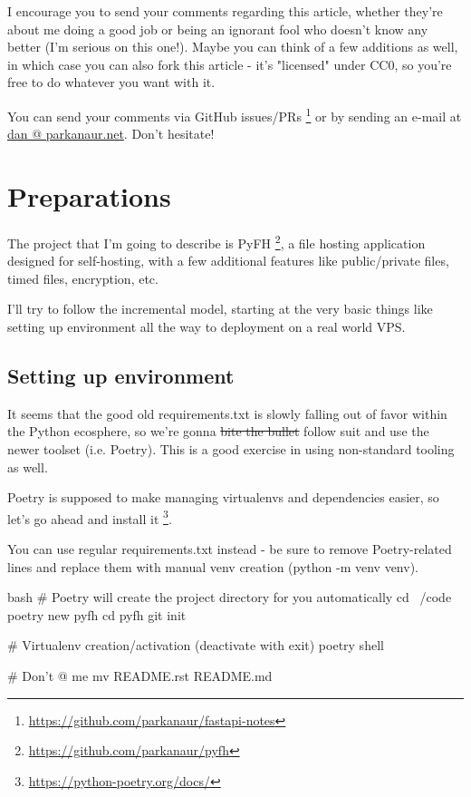 \documentclass[14pt]{extarticle}
\newcommand{\flink}[1]{\footnote{\href{#1}{#1}}}
\begin{document}
I encourage you to send your comments regarding this article, whether they're about me doing a good job or being an ignorant fool who doesn't know any better (I'm serious on this one!). Maybe you can think of a few additions as well, in which case you can also fork this article - it's "licensed" under CC0, so you're free to do whatever you want with it.

You can send your comments via GitHub issues/PRs \flink{https://github.com/parkanaur/fastapi-notes} or by sending an e-mail at {\href{mailto:dan@parkanaur.net}{dan @ parkanaur.net}}. Don't hesitate!

\section{Preparations}

The project that I'm going to describe is PyFH \flink{https://github.com/parkanaur/pyfh}, a file hosting application designed for self-hosting, with a few additional features like public/private files, timed files, encryption, etc.

I'll try to follow the incremental model, starting at the very basic things like setting up environment all the way to deployment on a real world VPS.

\subsection{Setting up environment}

It seems that the good old requirements.txt is slowly falling out of favor within the Python ecosphere, so we're gonna \sout{bite the bullet} follow suit and use the newer toolset (i.e. Poetry). This is a good exercise in using non-standard tooling as well.

Poetry is supposed to make managing virtualenvs and dependencies easier, so let's go ahead and install it \flink{https://python-poetry.org/docs/}.

You can use regular requirements.txt instead - be sure to remove Poetry-related lines and replace them with manual venv creation (python -m venv venv).

\begin{code}{bash}
    # Poetry will create the project directory for you automatically
    cd ~/code
    poetry new pyfh
    cd pyfh
    git init

    # Virtualenv creation/activation (deactivate with exit)
    poetry shell

    # Don't @ me
    mv README.rst README.md
\end{code}
\end{document}

